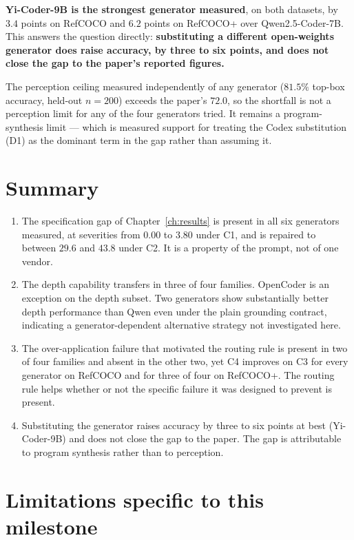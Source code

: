 \documentclass[12pt,a4paper,oneside]{report}
\begin{document}
\textbf{Yi-Coder-9B is the strongest generator measured}, on both datasets, by $3.4$
points on RefCOCO and $6.2$ points on RefCOCO+ over Qwen2.5-Coder-7B. This answers
the question directly: \textbf{substituting a different open-weights generator does
raise accuracy, by three to six points, and does not close the gap to the paper's
reported figures.}

The perception ceiling measured independently of any generator ($81.5\%$ top-box
accuracy, held-out $n=200$) exceeds the paper's $72.0$, so the shortfall is not a
perception limit for any of the four generators tried. It remains a program-synthesis
limit --- which is measured support for treating the Codex substitution (D1) as the
dominant term in the gap rather than assuming it.

\section{Summary}

\begin{enumerate}[leftmargin=1.8em, itemsep=4pt]
\item The specification gap of Chapter~\ref{ch:results} is present in all six
generators measured, at severities from $0.00$ to $3.80$ under C1, and is repaired to
between $29.6$ and $43.8$ under C2. It is a property of the prompt, not of one vendor.

\item The depth capability transfers in three of four families. OpenCoder is an
exception on the depth subset. Two generators show substantially better depth
performance than Qwen even under the plain grounding contract, indicating a
generator-dependent alternative strategy not investigated here.

\item The over-application failure that motivated the routing rule is present in two
of four families and absent in the other two, yet C4 improves on C3 for every
generator on RefCOCO and for three of four on RefCOCO+. The routing rule helps whether
or not the specific failure it was designed to prevent is present.

\item Substituting the generator raises accuracy by three to six points at best
(Yi-Coder-9B) and does not close the gap to the paper. The gap is attributable to
program synthesis rather than to perception.
\end{enumerate}

\section{Limitations specific to this milestone}
\end{document}
